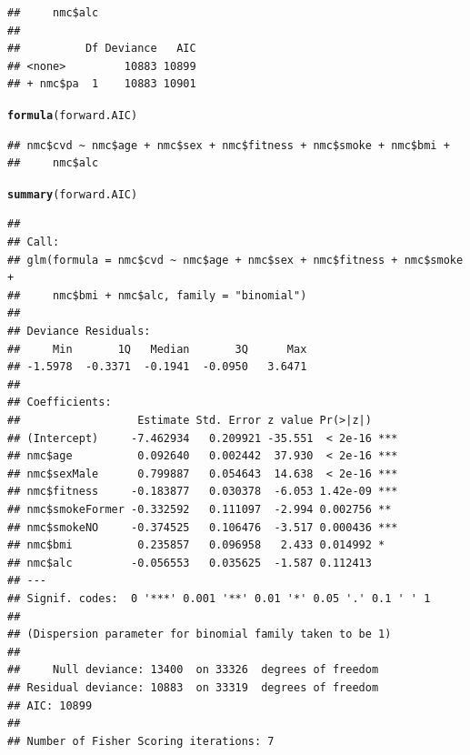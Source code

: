 \documentclass{article}\usepackage[]{graphicx}\usepackage[]{xcolor}
\makeatletter
\newcommand{\hlstd}[1]{\textcolor[rgb]{0.345,0.345,0.345}{#1}}%
\newcommand{\hlkwd}[1]{\textcolor[rgb]{0.737,0.353,0.396}{\textbf{#1}}}%
\newenvironment{kframe}{%
 \def\at@end@of@kframe{}%
 \ifinner\ifhmode%
  \def\at@end@of@kframe{\end{minipage}}%
  \begin{minipage}{\columnwidth}%
 \fi\fi%
 \def\FrameCommand##1{\hskip\@totalleftmargin \hskip-\fboxsep
 \colorbox{shadecolor}{##1}\hskip-\fboxsep
     \hskip-\linewidth \hskip-\@totalleftmargin \hskip\columnwidth}%
 \MakeFramed {\advance\hsize-\width
   \@totalleftmargin\z@ \linewidth\hsize
   \@setminipage}}%
 {\par\unskip\endMakeFramed%
 \at@end@of@kframe}
\newenvironment{knitrout}{}{} %
\makeatother
\begin{document}
\begin{knitrout}
\begin{kframe}
\begin{verbatim}
##     nmc$alc
## 
##          Df Deviance   AIC
## <none>         10883 10899
## + nmc$pa  1    10883 10901
\end{verbatim}
\begin{alltt}
\hlkwd{formula}\hlstd{(forward.AIC)}
\end{alltt}
\begin{verbatim}
## nmc$cvd ~ nmc$age + nmc$sex + nmc$fitness + nmc$smoke + nmc$bmi + 
##     nmc$alc
\end{verbatim}
\begin{alltt}
\hlkwd{summary}\hlstd{(forward.AIC)}
\end{alltt}
\begin{verbatim}
## 
## Call:
## glm(formula = nmc$cvd ~ nmc$age + nmc$sex + nmc$fitness + nmc$smoke + 
##     nmc$bmi + nmc$alc, family = "binomial")
## 
## Deviance Residuals: 
##     Min       1Q   Median       3Q      Max  
## -1.5978  -0.3371  -0.1941  -0.0950   3.6471  
## 
## Coefficients:
##                  Estimate Std. Error z value Pr(>|z|)    
## (Intercept)     -7.462934   0.209921 -35.551  < 2e-16 ***
## nmc$age          0.092640   0.002442  37.930  < 2e-16 ***
## nmc$sexMale      0.799887   0.054643  14.638  < 2e-16 ***
## nmc$fitness     -0.183877   0.030378  -6.053 1.42e-09 ***
## nmc$smokeFormer -0.332592   0.111097  -2.994 0.002756 ** 
## nmc$smokeNO     -0.374525   0.106476  -3.517 0.000436 ***
## nmc$bmi          0.235857   0.096958   2.433 0.014992 *  
## nmc$alc         -0.056553   0.035625  -1.587 0.112413    
## ---
## Signif. codes:  0 '***' 0.001 '**' 0.01 '*' 0.05 '.' 0.1 ' ' 1
## 
## (Dispersion parameter for binomial family taken to be 1)
## 
##     Null deviance: 13400  on 33326  degrees of freedom
## Residual deviance: 10883  on 33319  degrees of freedom
## AIC: 10899
## 
## Number of Fisher Scoring iterations: 7
\end{verbatim}
\end{kframe}
\end{knitrout}
          
\end{document}
